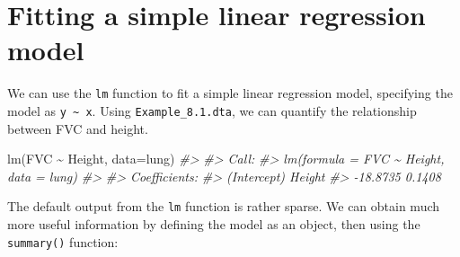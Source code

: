 \documentclass[
]{memoir}
\newenvironment{Shaded}{\begin{snugshade}}{\end{snugshade}}
\newcommand{\AttributeTok}[1]{\textcolor[rgb]{0.77,0.63,0.00}{#1}}
\newcommand{\CommentTok}[1]{\textcolor[rgb]{0.56,0.35,0.01}{\textit{#1}}}
\newcommand{\FunctionTok}[1]{\textcolor[rgb]{0.00,0.00,0.00}{#1}}
\newcommand{\NormalTok}[1]{#1}
\newcommand{\SpecialCharTok}[1]{\textcolor[rgb]{0.00,0.00,0.00}{#1}}
\begin{document}
\begin{Shaded}
\end{Shaded}

\hypertarget{fitting-a-simple-linear-regression-model}{%
\section{Fitting a simple linear regression model}\label{fitting-a-simple-linear-regression-model}}

We can use the \texttt{lm} function to fit a simple linear regression model, specifying the model as \texttt{y\ \textasciitilde{}\ x}. Using \texttt{Example\_8.1.dta}, we can quantify the relationship between FVC and height.

\begin{Shaded}
\begin{Highlighting}[]
\FunctionTok{lm}\NormalTok{(FVC }\SpecialCharTok{\textasciitilde{}}\NormalTok{ Height, }\AttributeTok{data=}\NormalTok{lung)}
\CommentTok{\#\textgreater{} }
\CommentTok{\#\textgreater{} Call:}
\CommentTok{\#\textgreater{} lm(formula = FVC \textasciitilde{} Height, data = lung)}
\CommentTok{\#\textgreater{} }
\CommentTok{\#\textgreater{} Coefficients:}
\CommentTok{\#\textgreater{} (Intercept)       Height  }
\CommentTok{\#\textgreater{}    {-}18.8735       0.1408}
\end{Highlighting}
\end{Shaded}

The default output from the \texttt{lm} function is rather sparse. We can obtain much more useful information by defining the model as an object, then using the \texttt{summary()} function:
\end{document}
